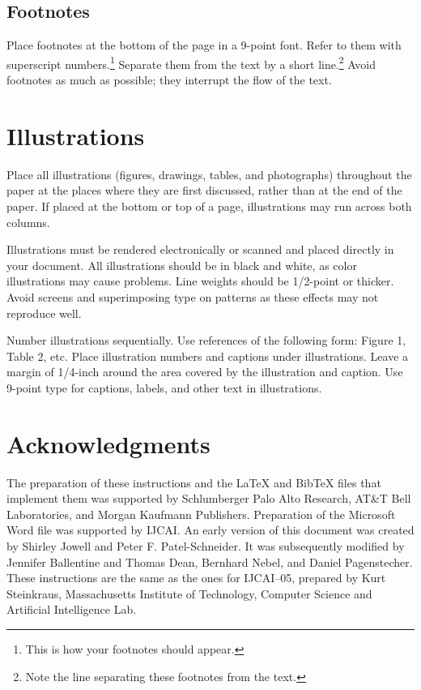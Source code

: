 \documentclass{article}
\begin{document}
\subsection{Footnotes}

Place footnotes at the bottom of the page in a 9-point font.  Refer to
them with superscript numbers.\footnote{This is how your footnotes
should appear.} Separate them from the text by a short
line.\footnote{Note the line separating these footnotes from the
text.} Avoid footnotes as much as possible; they interrupt the flow of
the text.

\section{Illustrations}

Place all illustrations (figures, drawings, tables, and photographs)
throughout the paper at the places where they are first discussed,
rather than at the end of the paper. If placed at the bottom or top of
a page, illustrations may run across both columns.

Illustrations must be rendered electronically or scanned and placed
directly in your document. All illustrations should be in black and
white, as color illustrations may cause problems. Line weights should
be 1/2-point or thicker. Avoid screens and superimposing type on
patterns as these effects may not reproduce well.

Number illustrations sequentially. Use references of the following
form: Figure 1, Table 2, etc. Place illustration numbers and captions
under illustrations. Leave a margin of 1/4-inch around the area
covered by the illustration and caption.  Use 9-point type for
captions, labels, and other text in illustrations.

\section*{Acknowledgments}

The preparation of these instructions and the \LaTeX{} and Bib\TeX{}
files that implement them was supported by Schlumberger Palo Alto
Research, AT\&T Bell Laboratories, and Morgan Kaufmann Publishers.
Preparation of the Microsoft Word file was supported by IJCAI.  An
early version of this document was created by Shirley Jowell and Peter
F. Patel-Schneider.  It was subsequently modified by Jennifer
Ballentine and Thomas Dean, Bernhard Nebel, and Daniel Pagenstecher.
These instructions are the same as the ones for IJCAI--05, prepared by
Kurt Steinkraus, Massachusetts Institute of Technology, Computer
Science and Artificial Intelligence Lab.
\end{document}
